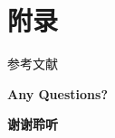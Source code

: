 \section{附录}

\begin{frame}{参考文献}
	\printbibliography
\end{frame}

\begin{frame}{}
    \centering
    \begin{LARGE}
        \textbf{\textcolor{SJTUPrimary}{Any Questions?}}
    \end{LARGE}
\end{frame}

\begin{frame}{}
    \centering
    \begin{LARGE}
        \textbf{\textcolor{SJTUPrimary}{谢谢聆听}}
    \end{LARGE}
\end{frame}
